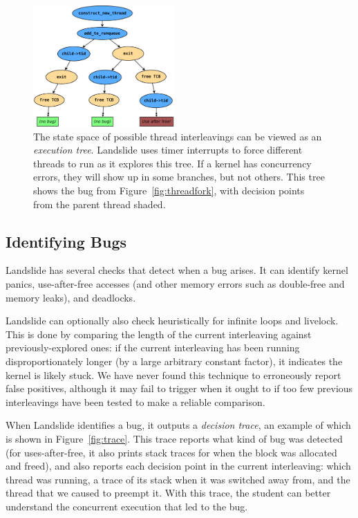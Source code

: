 \begin{figure}[t]
\includegraphics[width=0.48\textwidth]{threadfork/threadfork.pdf}
\caption{The state space of possible thread interleavings can be viewed as an {\em execution tree}.
Landslide uses timer interrupts to force different threads to run as it explores this tree.
If a kernel has concurrency errors, they will show up in some branches, but not others.
This tree shows the bug from Figure~\ref{fig:threadfork}, with decision points from the parent thread shaded.
}
\label{fig:tree}
\end{figure}

\subsection{Identifying Bugs}

Landslide has several checks that detect when a bug arises. It can identify kernel panics, use-after-free accesses (and other memory errors such as double-free and memory leaks), and deadlocks.

Landslide can optionally also check heuristically for infinite loops and livelock. This is done by comparing the length of the current interleaving against previously-explored ones: if the current interleaving has been running disproportionately longer (by a large arbitrary constant factor), it indicates the kernel is likely stuck.
We have never found this technique to erroneously report false positives, although it may fail to trigger when it ought to if too few previous interleavings have been tested to make a reliable comparison.

When Landslide identifies a bug, it outputs a {\em decision trace}, an example of which is shown in Figure~\ref{fig:trace}.
This trace reports what kind of bug was detected (for uses-after-free, it also prints stack traces for when the block was allocated and freed), and also reports each decision point in the current interleaving: which thread was running, a trace of its stack when it was switched away from, and the thread that we caused to preempt it. With this trace, the student can better understand the concurrent execution that led to the bug.

